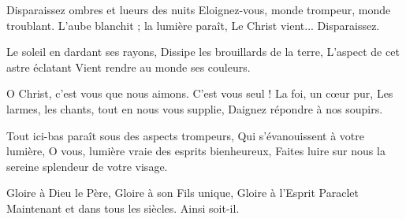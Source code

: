 Disparaissez ombres et lueurs des nuits
Eloignez-vous, monde trompeur, monde troublant.
L'aube blanchit ; la lumière paraît,
Le Christ vient... Disparaissez.

Le soleil en dardant ses rayons,
Dissipe les brouillards de la terre,
L'aspect de cet astre éclatant
Vient rendre au monde ses couleurs.

O Christ, c'est vous que nous aimons.
C'est vous seul ! La foi, un cœur pur,
Les larmes, les chants, tout en nous vous supplie,
Daignez répondre à nos soupirs.

Tout ici-bas paraît sous des aspects trompeurs,
Qui s'évanouissent à votre lumière,
O vous, lumière vraie des esprits bienheureux,
Faites luire sur nous la sereine splendeur de votre visage.

Gloire à Dieu le Père,
Gloire à son Fils unique,
Gloire à l'Esprit Paraclet
Maintenant et dans tous les siècles.
Ainsi soit-il.